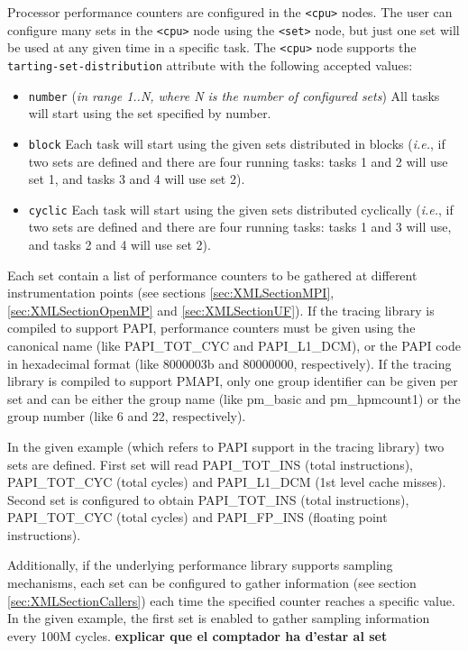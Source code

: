 Processor performance counters are configured in the {\tt <cpu>} nodes. The user can configure many sets in the {\tt <cpu>} node using the {\tt <set>} node, but just one set will be used at any given time in a specific task. The {\tt <cpu>} node supports the {\tt tarting-set-distribution} attribute with the following accepted values:

\begin{itemize}
 \item {\tt number} ({\em in range 1..N, where N is the number of configured sets}) All tasks will start using the set specified by number.
 \item {\tt block} Each task will start using the given sets distributed in blocks ({\em i.e.}, if two sets are defined and there are four running tasks: tasks 1 and 2 will use set 1, and tasks 3 and 4 will use set 2).
 \item {\tt cyclic} Each task will start using the given sets distributed cyclically ({\em i.e.}, if two sets are defined and there are four running tasks: tasks 1 and 3 will use, and tasks 2 and 4 will use set 2).
\end{itemize}

Each set contain a list of performance counters to be gathered at different instrumentation points (see sections \ref{sec:XMLSectionMPI}, \ref{sec:XMLSectionOpenMP} and \ref{sec:XMLSectionUF}). If the tracing library is compiled to support PAPI, performance counters must be given using the canonical name (like PAPI\_TOT\_CYC and PAPI\_L1\_DCM), or the PAPI code in hexadecimal format (like 8000003b and 80000000, respectively). If the tracing library is compiled to support PMAPI, only one group identifier can be given per set and can be either the group name (like pm\_basic and pm\_hpmcount1) or the group number (like 6 and 22, respectively). 

In the given example (which refers to PAPI support in the tracing library) two sets are defined. First set will read {PAPI\_TOT\_INS} (total instructions), {PAPI\_TOT\_CYC} (total cycles) and {PAPI\_L1\_DCM} (1st level cache misses). Second set is configured to obtain {PAPI\_TOT\_INS} (total instructions), {PAPI\_TOT\_CYC} (total cycles) and {PAPI\_FP\_INS} (floating point instructions).

Additionally, if the underlying performance library supports sampling mechanisms, each set can be configured to gather information (see section \ref{sec:XMLSectionCallers}) each time the specified counter reaches a specific value. In the given example, the first set is enabled to gather sampling information every 100M cycles. {\bf explicar que el comptador ha d'estar al set}

